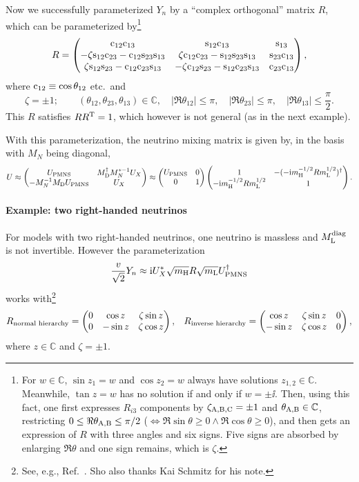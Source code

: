 \documentclass[CheatSheet]{subfiles}
\begin{document}
Now we successfully parameterized $Y_n$ by a ``complex orthogonal'' matrix $R$, which can be parameterized by\footnote{For $w\in\mathbb C$, $\sin z_1=w$ and $\cos z_2=w$ always have solutions $z_{1,2}\in\mathbb C$. Meanwhile, $\tan z=w$ has no solution if and only if $w=\pm \ii$. Then, using this fact, one first expresses $R_{i3}$ components by $\zeta\w{A,B,C}=\pm1$ and $\theta\w{A,B}\in\mathbb C$, restricting $0\le\Re\theta\w{A,B}\le\pi/2$ ($\Leftrightarrow\Re{\sin{\theta}}\ge0\land\Re\cos\theta\ge0$), and then gets an expression of $R$ with three angles and six signs. Five signs are absorbed by enlarging $\Re\theta$ and one sign remains, which is $\zeta$.}
\begin{equation}
 R=\begin{pmatrix}
 \mathrm{c}_{12} \mathrm{c}_{13} & \mathrm{s}_{12} \mathrm{c}_{13} & \mathrm{s}_{13} \\
 -\zeta \mathrm{s}_{12} \mathrm{c}_{23}-\mathrm{c}_{12} \mathrm{s}_{23} \mathrm{s}_{13} & \zeta \mathrm{c}_{12} \mathrm{c}_{23} -\mathrm{s}_{12} \mathrm{s}_{23} \mathrm{s}_{13} & \mathrm{s}_{23} \mathrm{c}_{13} \\
  \zeta \mathrm{s}_{12} \mathrm{s}_{23}-\mathrm{c}_{12} \mathrm{c}_{23} \mathrm{s}_{13} & -\zeta\mathrm{c}_{12} \mathrm{s}_{23} -\mathrm{s}_{12} \mathrm{c}_{23} \mathrm{s}_{13} & \mathrm{c}_{23} \mathrm{c}_{13}
\end{pmatrix},
\end{equation}
where $\mathrm{c}_{12}\equiv \cos{\theta_{12}}$ etc.\ and
\begin{equation}
 \zeta=\pm1; \qquad
(\theta_{12},\theta_{23},\theta_{13})\in\mathbb C,\quad
|\Re\theta_{12}|\le\pi, \quad |\Re\theta_{23}|\le\pi,  \quad |\Re\theta_{13}|\le\frac{\pi}{2}.
\end{equation}
This $R$ satisfies $RR^{\mathrm{T}}=1$, which however is not general (as in the next example).

With this parameterization, the neutrino mixing matrix is given by, in the basis with $M_N$ being diagonal,
\begin{equation}
 U \approx \pmat{
  U\w{PMNS}
  &  M\w{D}^\dagger M_N^{*-1} U_X
  \\ -M_N^{-1} M\w{D} U\w{PMNS}
  &  U_X
}
\approx\pmat{U\w{PMNS}&0\\0&1}\pmat{
  1
  &  -(-\ii{m\w H^{-1/2}}R{m\w L^{1/2}})^\dagger
  \\ -\ii m\w H^{-1/2}R{m\w L^{1/2}}
  &  1
}.
\end{equation}

\paragraph{Example: two right-handed neutrinos}
For models with two right-handed neutrinos, one neutrino is massless and $M\w L\wdiag$ is not invertible. However the parameterization
\begin{equation}
 \frac{v}{\sqrt2}Y_n
  \approx \ii U_X^*\sqrt{m\w H}R\sqrt{m\w L}U\w{PMNS}^\dagger
\end{equation}
works with\footnote{See, e.g., Ref.~\cite{Brdar:2019iem}. Sho also thanks Kai Schmitz for his note.}
\begin{align}
 R_{\text{normal hierarchy}}&=\begin{pmatrix}0 & \cos z & \zeta\sin z \\ 0 & -\sin z & \zeta \cos z\end{pmatrix},&
 R_{\text{inverse hierarchy}}=\begin{pmatrix}\cos z & \zeta\sin z &0 \\ -\sin z & \zeta \cos z & 0\end{pmatrix},
\end{align}
where $z\in\mathbb C$ and $\zeta=\pm1$.
\end{document}
